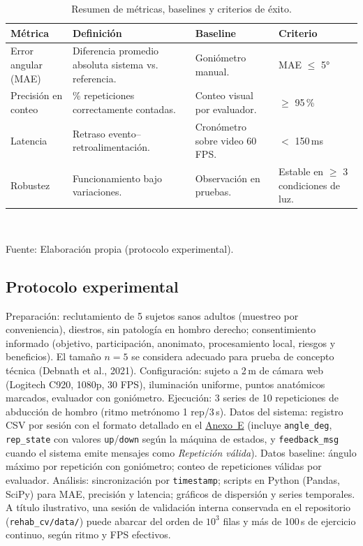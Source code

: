 \documentclass[11pt,a4paper]{article}
\renewcommand{\arraystretch}{1.35}
\begin{document}
\begin{table}[htbp]
\caption{Resumen de métricas, baselines y criterios de éxito.}
\label{tab:metricas}
\small
\centering
\renewcommand{\arraystretch}{1.5}
\begin{tabular}{@{}p{2.6cm}p{3.4cm}p{3cm}p{2.6cm}@{}}
\toprule
Métrica & Definición & Baseline & Criterio \\
\midrule
Error angular (MAE) & Diferencia promedio absoluta sistema vs. referencia. & Goniómetro manual. & MAE $\leq$ 5° \\
\addlinespace
Precisión en conteo & \% repeticiones correctamente contadas. & Conteo visual por evaluador. & $\geq$ 95\,\% \\
\addlinespace
Latencia & Retraso evento--retroalimentación. & Cronómetro sobre video 60 FPS. & $<$ 150\,ms \\
\addlinespace
Robustez & Funcionamiento bajo variaciones. & Observación en pruebas. & Estable en $\geq$ 3 condiciones de luz. \\
\bottomrule
\end{tabular}\\
\renewcommand{\arraystretch}{1.35}
\vspace{4pt}
\raggedright\footnotesize Fuente: Elaboración propia (protocolo experimental).
\end{table}
\vspace{0.6em}

\subsection{Protocolo experimental}
Preparación: reclutamiento de 5 sujetos sanos adultos (muestreo por conveniencia), diestros, sin patología en hombro derecho; consentimiento informado (objetivo, participación, anonimato, procesamiento local, riesgos y beneficios). El tamaño $n=5$ se considera adecuado para prueba de concepto técnica (Debnath et al., 2021). Configuración: sujeto a 2\,m de cámara web (Logitech C920, 1080p, 30 FPS), iluminación uniforme, puntos anatómicos marcados, evaluador con goniómetro. Ejecución: 3 series de 10 repeticiones de abducción de hombro (ritmo metrónomo 1 rep/3\,s). Datos del sistema: registro CSV por sesión con el formato detallado en el \hyperref[anexo:csv-sesion]{Anexo~E} (incluye \texttt{angle\_deg}, \texttt{rep\_state} con valores \texttt{up}/\texttt{down} según la máquina de estados, y \texttt{feedback\_msg} cuando el sistema emite mensajes como \textit{Repetición válida}). Datos baseline: ángulo máximo por repetición con goniómetro; conteo de repeticiones válidas por evaluador. Análisis: sincronización por \texttt{timestamp}; scripts en Python (Pandas, SciPy) para MAE, precisión y latencia; gráficos de dispersión y series temporales. A título ilustrativo, una sesión de validación interna conservada en el repositorio (\texttt{rehab\_cv/data/}) puede abarcar del orden de $10^3$ filas y más de 100\,s de ejercicio continuo, según ritmo y FPS efectivos.
\end{document}
